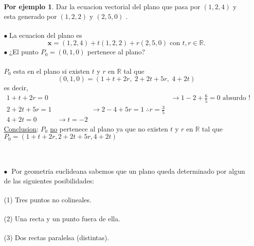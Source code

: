 \documentclass{article}
\theoremstyle{definition}
\newtheorem*{ej}{Por ejemplo}
\theoremstyle{remark}
\newcommand\bl{$\bullet\;$}
\begin{document}
\begin{figure}[h]
\centering
\def\svgwidth{0.75\textwidth}

\end{figure}
\begin{ej}
  Dar la ecuacion vectorial del plano que pasa por $(1,2,4)$ y esta generado por $(1,2,2)$ y $(2,5,0)$ . \\ \\ 
  \bl La ecuacion del plano es \[ 
    \mathbf{x}=(1,2,4)+t(1,2,2)+r(2,5,0) \text{ con } t, r \in \mathbb{R}.
    \] \bl ¿El punto $P_0=(0,1,0)$ pertenece al plano? \\\\ $P_0$ esta en el plano si existen $t$ y $r$ en $\mathbb{R}$ tal que $$(0,1,0)=(1+t+2r,\; 2+2t+5r, \;4+2t)$$ es decir, \[
    \begin{array}{lll}
      1+t+2r=0 & & \longrightarrow 1-2+\frac{6}{5} = 0 \text{ absurdo !}\\
2+2t+5r =1 & \quad \quad \quad \quad \quad \longrightarrow 2-4+5r=1 \; \therefore r = \frac{3}{5} &  \\
4+2t = 0 & \to t = -2 & 
    \end{array}
  \] \underline{Conclusion}: $P_0$ \underline{no} pertenece al plano ya que no existen $t$ y $r$ en $\mathbb{R}$ tal que $P_0=(1+t+2r, 2+2t+5r,4+2t)$
\end{ej}
\; \\ \\ 
\textcolor{rojop2}{\bl} Por geometria euclideana sabemos que un plano queda determinado por algun de las siguientes posibilidades: \\\\
\textcolor{rojop2}{(1)} Tres puntos no colineales. \\\\
\textcolor{rojop2}{(2)} Una recta y un punto fuera de ella. \\\\ 
\textcolor{rojop2}{(3)} Dos rectas paralelsa (distintas). \\\\
\end{document}
